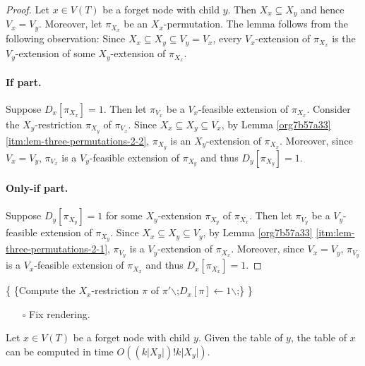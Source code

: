 \documentclass[fontsize=11pt,paper=a4]{book}
\begin{document}
\begin{proof}
Let \(x\in V(T)\) be a forget node with child \(y\).
Then \(X_x\subseteq X_y\) and hence \(V_x=V_y\).
Moreover, let \(\pi_{X_x}\) be an \(X_x\)-permutation.
The lemma follows from the following observation:
Since \(X_x\subseteq X_y\subseteq V_y=V_x\), every \(V_x\)-extension of \(\pi_{X_x}\) is the \(V_y\)-extension of some \(X_y\)-extension of \(\pi_{X_x}\).

\paragraph{If part.}
Suppose \(D_x[\pi_{X_x}]=1\).
Then let \(\pi_{V_x}\) be a \(V_x\)-feasible extension of \(\pi_{X_x}\).
Consider the \(X_y\)-restriction \(\pi_{X_y}\) of \(\pi_{V_x}\).
Since \(X_x\subseteq X_y\subseteq V_x\), by Lemma \ref{org7b57a33} \ref{itm:lem-three-permutations-2-2}, \(\pi_{X_y}\) is an \(X_y\)-extension of \(\pi_{X_x}\).
Moreover, since \(V_x=V_y\), \(\pi_{V_x}\) is a \(V_y\)-feasible extension of \(\pi_{X_y}\) and thus \(D_y[\pi_{X_y}]=1\).

\paragraph{Only-if part.}
Suppose \(D_y[\pi_{X_y}]=1\) for some \(X_y\)-extension \(\pi_{X_y}\) of \(\pi_{X_x}\).
Then let \(\pi_{V_y}\) be a \(V_y\)-feasible extension of \(\pi_{X_y}\).
Since \(X_x\subseteq X_y\subseteq V_y\), by Lemma \ref{org7b57a33} \ref{itm:lem-three-permutations-2-1}, \(\pi_{V_y}\) is a \(V_y\)-extension of \(\pi_{X_x}\).
Moreover, since \(V_x=V_y\), \(\pi_{V_y}\) is a \(V_x\)-feasible extension of \(\pi_{X_x}\) and thus \(D_x[\pi_{X_x}]=1\).
\end{proof}

\begin{algorithm}
\DontPrintSemicolon
{}
\{
\{Compute the \(X_x\)-restriction \(\pi\) of \(\pi'\)$\backslash$;\label{line:alg-forget-nodes-1}\(D_x[\pi]\gets 1\)$\backslash$;\}
\}
\label{org5a81387}
\end{algorithm}

\begin{itemize}
\item[{$\square$}] Fix rendering.
\end{itemize}


\begin{lem}
Let \(x\in V(T)\) be a forget node with child \(y\).
Given the table of \(y\), the table of \(x\) can be computed in time \(O((k\lvert X_y\rvert)!k\lvert X_y\rvert)\).
\label{org1e5c064}
\end{lem}
\end{document}

